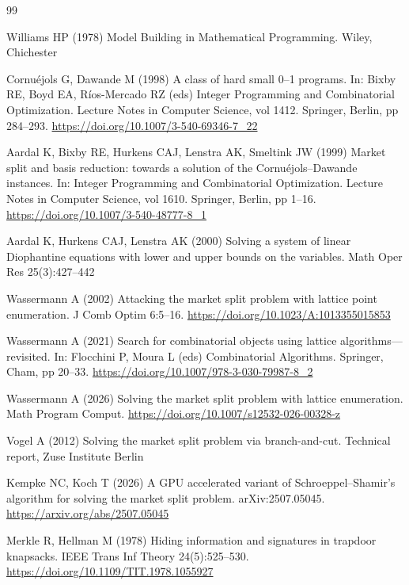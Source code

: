 \documentclass[pdflatex,sn-mathphys-num]{sn-jnl}
\theoremstyle{thmstyleone}
\theoremstyle{thmstylethree}
\begin{document}
\begin{thebibliography}{99}

Williams HP (1978) Model Building in Mathematical Programming. Wiley, Chichester

Cornu\'ejols G, Dawande M (1998) A class of hard small 0--1 programs. In: Bixby RE, Boyd EA, R\'ios-Mercado RZ (eds) Integer Programming and Combinatorial Optimization. Lecture Notes in Computer Science, vol 1412. Springer, Berlin, pp 284--293. \url{https://doi.org/10.1007/3-540-69346-7_22}

Aardal K, Bixby RE, Hurkens CAJ, Lenstra AK, Smeltink JW (1999) Market split and basis reduction: towards a solution of the Cornu\'ejols--Dawande instances. In: Integer Programming and Combinatorial Optimization. Lecture Notes in Computer Science, vol 1610. Springer, Berlin, pp 1--16. \url{https://doi.org/10.1007/3-540-48777-8_1}

Aardal K, Hurkens CAJ, Lenstra AK (2000) Solving a system of linear Diophantine equations with lower and upper bounds on the variables. Math Oper Res 25(3):427--442

Wassermann A (2002) Attacking the market split problem with lattice point enumeration. J Comb Optim 6:5--16. \url{https://doi.org/10.1023/A:1013355015853}

Wassermann A (2021) Search for combinatorial objects using lattice algorithms---revisited. In: Flocchini P, Moura L (eds) Combinatorial Algorithms. Springer, Cham, pp 20--33. \url{https://doi.org/10.1007/978-3-030-79987-8_2}

Wassermann A (2026) Solving the market split problem with lattice enumeration. Math Program Comput. \url{https://doi.org/10.1007/s12532-026-00328-z}

Vogel A (2012) Solving the market split problem via branch-and-cut. Technical report, Zuse Institute Berlin

Kempke NC, Koch T (2026) A GPU accelerated variant of Schroeppel--Shamir's algorithm for solving the market split problem. arXiv:2507.05045. \url{https://arxiv.org/abs/2507.05045}

Merkle R, Hellman M (1978) Hiding information and signatures in trapdoor knapsacks. IEEE Trans Inf Theory 24(5):525--530. \url{https://doi.org/10.1109/TIT.1978.1055927}


\end{thebibliography}
\end{document}
